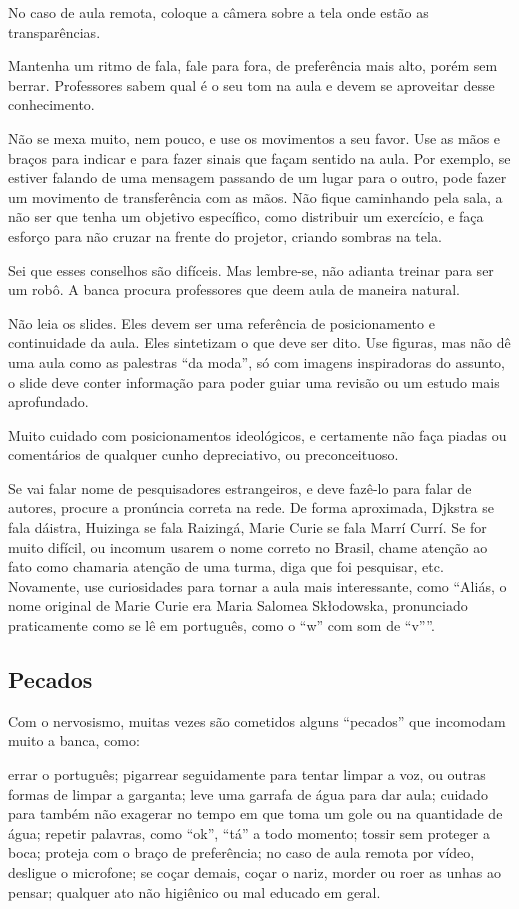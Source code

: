 \documentclass[12pt]{article}
\begin{document}
No caso de aula remota, coloque a câmera sobre a tela onde estão as transparências.

Mantenha um ritmo de fala, fale para fora, de preferência mais alto, porém sem berrar. Professores sabem qual é o seu tom na aula e devem se aproveitar desse conhecimento.

Não se mexa muito, nem pouco, e use os movimentos a seu favor.  Use as mãos e braços para indicar e para fazer sinais que façam sentido na aula. Por exemplo, se estiver falando de uma mensagem passando de um lugar para o outro, pode fazer um movimento de transferência com as mãos. Não fique caminhando pela sala, a não ser que tenha um objetivo específico, como distribuir um exercício, e faça esforço para não cruzar na frente do projetor, criando sombras na tela.

Sei que esses conselhos são difíceis. Mas lembre-se, não adianta treinar para ser um robô. A banca procura professores que deem aula de maneira natural.


Não leia os slides. Eles devem ser uma referência de posicionamento e continuidade da aula. Eles sintetizam o que deve ser dito. Use figuras, mas não dê uma aula como as palestras ``da moda'', só com imagens inspiradoras do assunto, o slide deve conter informação para poder guiar uma revisão ou um estudo mais aprofundado.

Muito cuidado com posicionamentos ideológicos, e certamente não faça piadas ou comentários de qualquer cunho depreciativo, ou preconceituoso.


Se vai falar nome de pesquisadores estrangeiros, e deve fazê-lo para falar de autores, procure a pronúncia correta na rede. De forma aproximada, Djkstra se fala dáistra, Huizinga se fala Raizingá, Marie Curie se fala Marrí Currí. Se for muito difícil, ou incomum usarem o nome correto no Brasil, chame atenção ao fato como chamaria atenção de uma turma, diga que foi pesquisar, etc. Novamente, use curiosidades para tornar a aula mais interessante, como ``Aliás, o nome original de Marie Curie era Maria Salomea Sk\l odowska, pronunciado praticamente como se lê em português, como o ``w'' com som de ``v''''.

\subsection{Pecados}

Com o nervosismo, muitas vezes são cometidos alguns ``pecados'' que incomodam muito a banca, como:
\begin{outline}
\1 errar o português;
\1 pigarrear seguidamente para tentar limpar a voz, ou outras formas de limpar a garganta;
\2 leve uma garrafa de água para dar aula;
\3 cuidado para também não exagerar no tempo em que toma um gole ou na quantidade de água;
\1 repetir palavras, como ``ok'', ``tá'' a todo momento;
\1 tossir sem proteger a boca;
\2 proteja com o braço de preferência;
\2 no caso de aula remota por vídeo, desligue o microfone;
\1 se coçar demais, coçar o nariz, morder ou roer as unhas ao pensar;
\1 qualquer ato não higiênico ou mal educado em geral.
\end{outline}
\end{document}
